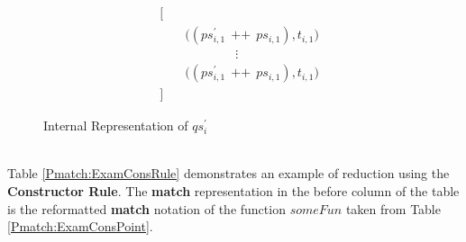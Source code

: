 \documentclass[11pt]{article}
\begin{document}
\begin{figure}
\begin{align*}
&\bigg[\\
&\qquad \big((ps_{i,1}^{\prime}~~\texttt{++}~~ps_{i,1}),t_{i,1}\big) \\ 
&\qquad \qquad \qquad \vdots \\
&\qquad \big((ps_{i,1}^{\prime}~~\texttt{++}~~ps_{i,1}),t_{i,1}\big) \\ 
&\bigg]
\end{align*}
\caption{Internal Representation of $qs_i^{\prime} $} \label{fig:PMatch_QsPrimeForm}
\end{figure}
~~\\
Table \ref {Pmatch:ExamConsRule} demonstrates an example of reduction using the {\bf Constructor Rule}. The {\bf match} representation in the before column of the table is the reformatted {\bf match} notation of the function $someFun$ taken from Table \ref {Pmatch:ExamConsPoint}.
~~\\
\end{document}
